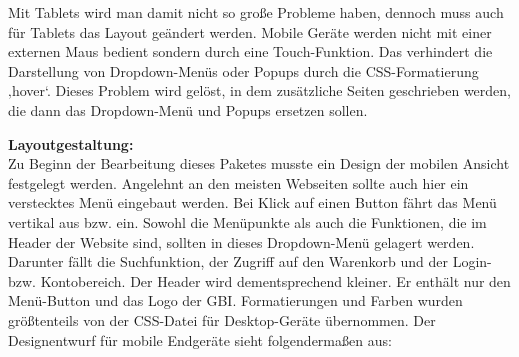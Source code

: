 Mit Tablets wird man damit nicht so große Probleme haben, dennoch muss auch für Tablets das Layout geändert werden. 
Mobile Geräte werden nicht mit einer externen Maus bedient sondern durch eine Touch-Funktion. Das verhindert die Darstellung von Dropdown-Menüs oder Popups durch die CSS-Formatierung ‚hover‘. Dieses Problem wird gelöst, in dem zusätzliche Seiten geschrieben werden, die dann das Dropdown-Menü und Popups ersetzen sollen.

\newpage
\textbf{Layoutgestaltung:}
\\
Zu Beginn der Bearbeitung dieses Paketes musste ein Design der mobilen Ansicht festgelegt werden. Angelehnt an den meisten Webseiten sollte auch hier ein verstecktes Menü eingebaut werden. Bei Klick auf einen Button fährt das Menü vertikal aus bzw. ein. Sowohl die Menüpunkte als auch die Funktionen, die im Header der Website sind, sollten in dieses Dropdown-Menü gelagert werden. Darunter fällt die Suchfunktion, der Zugriff auf den Warenkorb und der Login- bzw. Kontobereich. Der Header wird dementsprechend kleiner. Er enthält nur den Menü-Button und das Logo der GBI.
Formatierungen und Farben wurden größtenteils von der CSS-Datei für Desktop-Geräte übernommen. 
Der Designentwurf für mobile Endgeräte sieht folgendermaßen aus:

